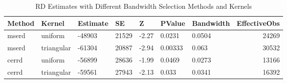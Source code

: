 \begin{table}[ht]
\centering
\begin{tabular}{lllllllr}
  \hline
Method & Kernel & Estimate & SE & Z & PValue & Bandwidth & EffectiveObs \\ 
  \hline
mserd & uniform & -48903 & 21529 & -2.27 & 0.0231 & 0.0504 & 24269 \\ 
  mserd & triangular & -61304 & 20887 & -2.94 & 0.00333 & 0.063 & 30532 \\ 
  cerrd & uniform & -56899 & 28636 & -1.99 & 0.0469 & 0.0273 & 13166 \\ 
  cerrd & triangular & -59561 & 27943 & -2.13 & 0.033 & 0.0341 & 16392 \\ 
   \hline
\end{tabular}
\caption{RD Estimates with Different Bandwidth Selection Methods and Kernels} 
\label{tab:rd_bandwidth_kernel_results}
\end{table}


